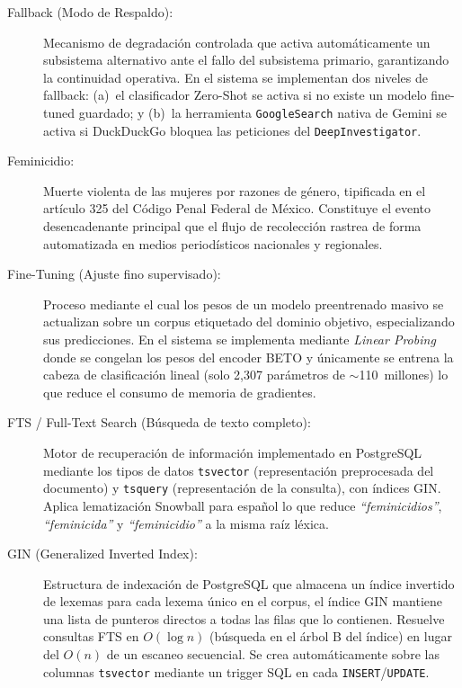 \begin{description}
    \item[\hypertarget{tFallback}{Fallback (Modo de Respaldo):}]
    Mecanismo de degradación controlada que activa automáticamente un subsistema
    alternativo ante el fallo del subsistema primario, garantizando la continuidad
    operativa. En el sistema se implementan dos niveles de fallback: (a)~el
    clasificador Zero-Shot se activa si no existe un modelo fine-tuned guardado;
    y (b)~la herramienta \texttt{GoogleSearch} nativa de Gemini se activa si
    DuckDuckGo bloquea las peticiones del \texttt{DeepInvestigator}.

    \item[\hypertarget{tFeminicidio}{Feminicidio:}]
    Muerte violenta de las mujeres por razones de género, tipificada en el artículo
    325 del Código Penal Federal de México. Constituye el evento desencadenante
    principal que el flujo de recolección rastrea de forma automatizada en medios
    periodísticos nacionales y regionales.

    \item[\hypertarget{tFineTuning}{Fine-Tuning (Ajuste fino supervisado):}]
    Proceso mediante el cual los pesos de un modelo preentrenado masivo se actualizan
    sobre un corpus etiquetado del dominio objetivo, especializando sus predicciones.
    En el sistema se implementa mediante \textit{Linear Probing} donde se congelan los
    pesos del encoder BETO y únicamente se entrena la cabeza de clasificación lineal
    (solo 2{,}307 parámetros de $\sim$110~millones) lo que reduce el consumo de
    memoria de gradientes.

    \item[\hypertarget{tFTS}{FTS / Full-Text Search (Búsqueda de texto completo):}]
    Motor de recuperación de información implementado en PostgreSQL mediante
    los tipos de datos \texttt{tsvector} (representación preprocesada del documento)
    y \texttt{tsquery} (representación de la consulta), con índices GIN. Aplica
    lematización Snowball para español lo que reduce \textit{``feminicidios''},
    \textit{``feminicida''} y \textit{``feminicidio''} a la misma raíz léxica.

    \item[\hypertarget{tGIN}{GIN (Generalized Inverted Index):}]
    Estructura de indexación de PostgreSQL que almacena un índice invertido de
    lexemas para cada lexema único en el corpus, el índice GIN mantiene una lista
    de punteros directos a todas las filas que lo contienen. Resuelve consultas
    FTS en $O(\log n)$ (búsqueda en el árbol B del índice) en lugar del $O(n)$
    de un escaneo secuencial. Se crea automáticamente sobre las columnas
    \texttt{tsvector} mediante un trigger SQL en cada \texttt{INSERT}/\texttt{UPDATE}.


\end{description}
